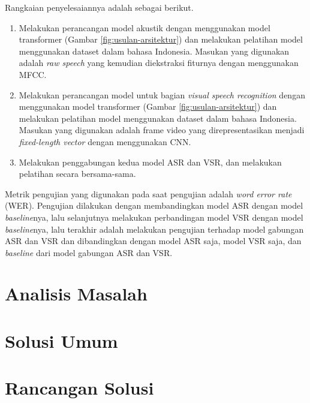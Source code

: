 Rangkaian penyelesaiannya adalah sebagai berikut.
\begin{enumerate}
    \item Melakukan perancangan model akustik dengan menggunakan model transformer (Gambar \ref{fig:usulan-arsitektur}) dan melakukan pelatihan model menggunakan dataset dalam bahasa Indonesia. Masukan yang digunakan adalah \textit{raw speech} yang kemudian diekstraksi fiturnya dengan menggunakan MFCC.
    \item Melakukan perancangan model untuk bagian \textit{visual speech recognition} dengan menggunakan model transformer (Gambar \ref{fig:usulan-arsitektur}) dan melakukan pelatihan model menggunakan dataset dalam bahasa Indonesia. Masukan yang digunakan adalah frame video yang direpresentasikan menjadi \textit{fixed-length vector} dengan menggunakan CNN.
    \item Melakukan penggabungan kedua model ASR dan VSR, dan melakukan pelatihan secara bersama-sama.
\end{enumerate}

Metrik pengujian yang digunakan pada saat pengujian adalah \textit{word error rate} (WER). Pengujian dilakukan dengan membandingkan model ASR dengan model \textit{baseline}nya, lalu selanjutnya melakukan perbandingan model VSR dengan model \textit{baseline}nya, lalu terakhir adalah melakukan pengujian terhadap model gabungan ASR dan VSR dan dibandingkan dengan model ASR saja, model VSR saja, dan \textit{baseline} dari model gabungan ASR dan VSR.

\section{Analisis Masalah}
\blindtext

\section{Solusi Umum}
\blindtext

\section{Rancangan Solusi}
\blindtext